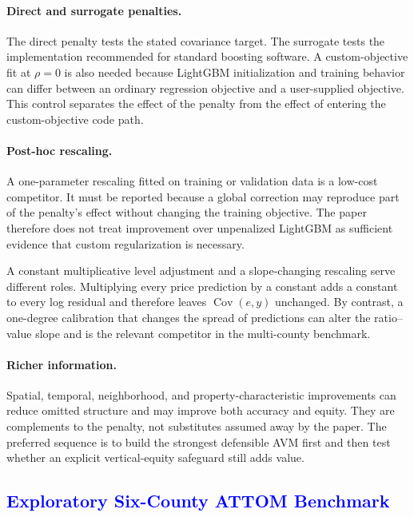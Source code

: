 \documentclass[10pt]{article}
\theoremstyle{definition}
\newcommand{\Cov}{\operatorname{Cov}}
\newcommand{\1}{\mathbf{1}}
\newcommand{\blueheading}[1]{\texorpdfstring{\textcolor{blue}{#1}}{#1}}
\begin{document}
{{\paragraph{Direct and surrogate penalties.}
The direct penalty tests the stated covariance target. The surrogate tests the implementation recommended for standard boosting software. A custom-objective fit at $\rho=0$ is also needed because LightGBM initialization and training behavior can differ between an ordinary regression objective and a user-supplied objective. This control separates the effect of the penalty from the effect of entering the custom-objective code path.

\paragraph{Post-hoc rescaling.}
A one-parameter rescaling fitted on training or validation data is a low-cost competitor. It must be reported because a global correction may reproduce part of the penalty's effect without changing the training objective. The paper therefore does not treat improvement over unpenalized LightGBM as sufficient evidence that custom regularization is necessary.

A constant multiplicative level adjustment and a slope-changing rescaling serve different roles. Multiplying every price prediction by a constant adds a constant to every log residual and therefore leaves $\Cov(e,y)$ unchanged. By contrast, a one-degree calibration that changes the spread of predictions can alter the ratio--value slope and is the relevant competitor in the multi-county benchmark.

\paragraph{Richer information.}
Spatial, temporal, neighborhood, and property-characteristic improvements can reduce omitted structure and may improve both accuracy and equity. They are complements to the penalty, not substitutes assumed away by the paper. The preferred sequence is to build the strongest defensible AVM first and then test whether an explicit vertical-equity safeguard still adds value.

\subsection{\blueheading{Exploratory Six-County ATTOM Benchmark}}
\label{subsec:attom_design}

}}
\end{document}
